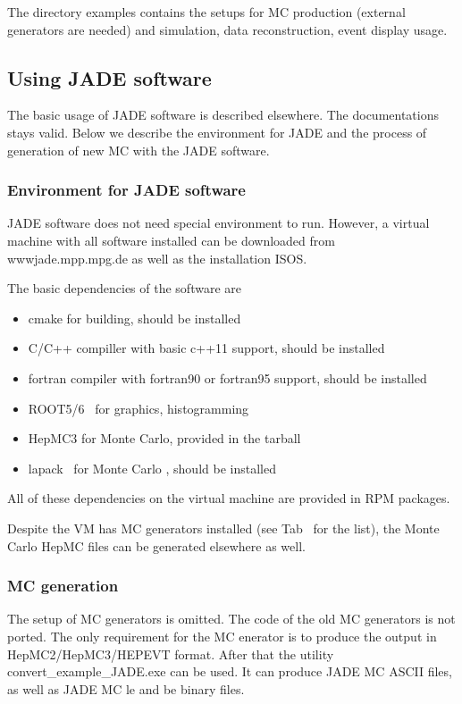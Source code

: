 The directory examples contains the setups for MC production (external generators are needed) and simulation, data reconstruction,
event display usage.


\subsection{Using JADE software}
The basic usage of JADE software is described elsewhere.
The documentations stays valid.
Below we describe the environment for JADE and the process of generation of new MC with the JADE software.

\subsubsection{Environment for JADE software}
JADE software does not need special environment to run.
However, a virtual machine with all software installed can be downloaded 
from wwwjade.mpp.mpg.de as well as the installation ISOS.

The basic dependencies of the software are 
\begin{itemize}
\item cmake for building, should be installed
\item C/C++ compiller with basic c++11 support, should be installed
\item fortran compiler with fortran90 or fortran95 support, should be installed
\item ROOT5/6~\cite{Antcheva:2009zz} for graphics, histogramming
\item HepMC3 for Monte Carlo, provided in the tarball 
\item lapack~\cite{lapack} for Monte Carlo , should be installed
\end{itemize}
All of these dependencies on the virtual machine are provided in RPM packages.

Despite the VM has MC generators installed (see Tab~ for the list), the  Monte Carlo HepMC files can be generated elsewhere as well.


\subsubsection{MC generation}

The setup of MC generators is omitted. The code of the old MC generators is not ported.
The only requirement for the MC enerator is to produce the 
output in HepMC2/HepMC3/HEPEVT format.
After that the utility convert\_example\_JADE.exe can be used.
It can produce JADE MC ASCII  files, as well as JADE MC le and be binary files.

